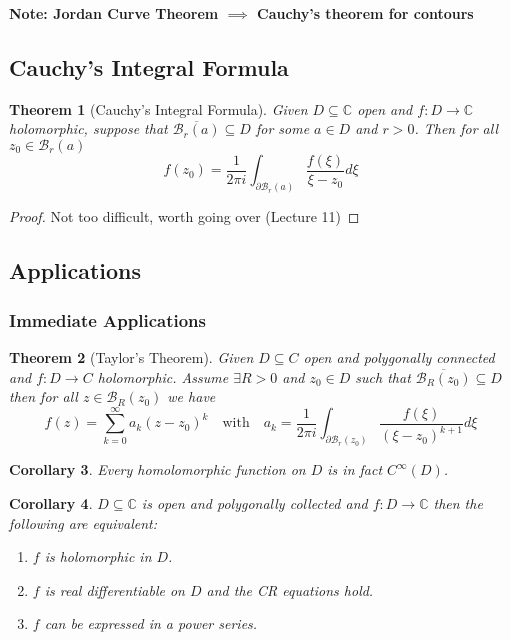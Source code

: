 \documentclass[11pt]{article}
\newcommand{\C}{\mathbb{C}}
\newenvironment{note}
	{\begin{mdframed}[backgroundcolor=white, linecolor=red, roundcorner=5pt, linewidth=1pt]\bfseries{Note:}\normalfont}
	{\end{mdframed}}
\newtheorem{theorem}{Theorem}[section]
\newtheorem{cor}[theorem]{Corollary}
\begin{document}
\begin{note}
Jordan Curve Theorem $\implies$ Cauchy's theorem for contours
\end{note}

\subsection{Cauchy's Integral Formula}
\begin{theorem}[Cauchy's Integral Formula]
Given $D\subseteq \C$ open and $f:D\to\C$ holomorphic, suppose that $\overline{\mathcal{B}_r(a)}\subseteq D$ for some $a\in D$ and $r>0$.
Then for all $z_0\in\mathcal{B}_r(a)$
\[
	f(z_0)=\frac{1}{2\pi i}\int_{\partial\mathcal{B}_r(a)}\frac{f(\xi)}{\xi-z_0}d\xi
\]
\end{theorem}

\begin{proof}
Not too difficult, worth going over (Lecture 11)
\end{proof}

\subsection{Applications}
\subsubsection{Immediate Applications}

\begin{theorem}[Taylor's Theorem]
Given $D\subseteq C$ open and polygonally connected and $f:D\to C$ holomorphic.
Assume $\exists R>0$ and $z_0\in D$ such that $\overline{\mathcal{B}_R(z_0)}\subseteq D$ then for all $z\in\mathcal{B}_R(z_0)$ we have
\[
	f(z)=\sum_{k=0}^{\infty}a_k(z-z_0)^k\quad\text{with}\quad a_k=\frac{1}{2\pi i}\int_{\partial \mathcal{B}_r(z_0)} \frac{f(\xi)}{(\xi - z_0)^{k+1}}d\xi
\]
\end{theorem}

\begin{cor}
	Every homolomorphic function on $D$ is in fact $C^\infty(D)$.
\end{cor}

\begin{cor}
$D\subseteq \C$ is open and polygonally collected and $f:D\to\C$ then the following are equivalent:
\begin{enumerate}[label=(\roman*)]
	\item $f$ is holomorphic in $D$.
	\item $f$ is real differentiable on $D$ and the CR equations hold.
	\item $f$ can be expressed in a power series.
\end{enumerate}
\end{cor}
\end{document}
